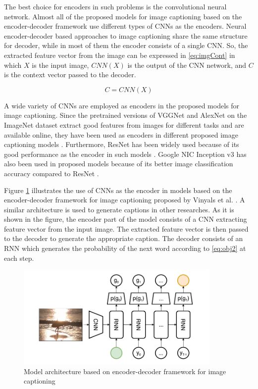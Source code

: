 \documentclass[preprint, 12pt]{elsarticle}
\begin{document}
		The best choice for encoders in such problems is the convolutional neural network. Almost all of the proposed models for image captioning based on the encoder-decoder framework use different types of CNNs as the encoders. Neural encoder-decoder based approaches to image captioning share the same structure for decoder, while in most of them the encoder consists of a single CNN. So, the extracted feature vector from the image can be expressed in \eqref{eq:imgCont} in which $X$ is the input image, $CNN(X)$ is the output of the CNN network, and $C$ is the context vector passed to the decoder.
		
		\begin{equation}
			C = CNN(X)
			\label{eq:imgCont}
		\end{equation} 
		
		A wide variety of CNNs are employed as encoders in the proposed models for image captioning. Since the pretrained versions of VGGNet \cite{simonyan2014very} and AlexNet \cite{krizhevsky2012imagenet} on the ImageNet dataset \cite{deng2009imagenet} extract good features from images for different tasks and are available online, they have been used as encoders in different proposed image captioning models \cite{karpathy2015deep} \cite{chen2017sca} \cite{pedersoli2017areas}. Furthermore, ResNet\cite{he2016deep} has been widely used because of its good performance as the encoder in such models \cite{lu2017knowing} \cite{rennie2017self} \cite{anderson2017bottom} \cite{yao2017boosting}. Google NIC Inception v3 \cite{szegedy2016rethinking} has also been used in proposed models because of its better image classification accuracy compared to ResNet \cite{zhang2017actor} \cite{ioffe2015batch} \cite{vinyals2015show} \cite{liu2017improved}. 
		
		Figure \ref{fig:imgCpt} illustrates the use of CNNs as the encoder in models based on the encoder-decoder framework for image captioning proposed by Vinyals et al. \cite{vinyals2015show}. A similar architecture is used to generate captions in other researches. As it is shown in the figure, the encoder part of the model consists of a CNN extracting feature vector from the input image. The extracted feature vector is then passed to the decoder to generate the appropriate caption. The decoder consists of an RNN which generates the probability of the next word according to \eqref{eq:obj2} at each step.
		
		\begin{figure}[H]
			\centering
			\includegraphics[scale=1]{Imgs/CNNImgCpt.png}
			\caption{Model architecture based on encoder-decoder framework for image captioning \cite{vinyals2015show}}
			\label{fig:imgCpt}
		\end{figure}
		
\end{document}
